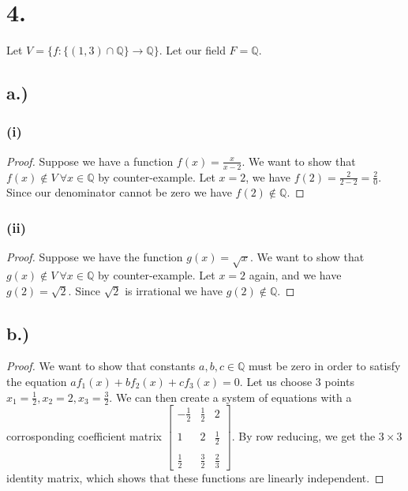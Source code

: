 \documentclass{article}
\begin{document}
\section*{4.}
Let $V = \{ f : \{(1,3) \cap \mathbb{Q}\} \rightarrow \mathbb{Q}\}$. Let our field $F = \mathbb{Q}$.
\subsection*{a.)}
\subsubsection*{(i)}
\begin{proof}
Suppose we have a function $f(x) = \frac{x}{x-2}$. We want to show that $f(x) \notin V \ \forall x \in \mathbb{Q}$ by counter-example. Let $x = 2$, we have $f(2) = \frac{2}{2-2} = \frac{2}{0}$. Since our denominator cannot be zero we have $f(2) \notin \mathbb{Q}$.

\end{proof}

\subsubsection*{(ii)}
\begin{proof}
Suppose we have the function $g(x) = \sqrt{x}$. We want to show that $g(x) \notin V \ \forall x \in \mathbb{Q}$ by counter-example. Let $x = 2$ again, and we have $g(2) = \sqrt{2}$. Since $\sqrt{2}$ is irrational we have $g(2) \notin \mathbb{Q}$.

\end{proof}

\subsection*{b.)}
\begin{proof}
We want to show that constants $a, b, c \in \mathbb{Q}$ must be zero in order to satisfy the equation $a f_1(x) + b f_2(x) + c f_3(x) = 0$. Let us choose 3 points $x_1 = \frac{1}{2}, x_2 = 2, x_3 = \frac{3}{2}$. We can then create a system of equations with a corrosponding coefficient matrix 
$\begin{bmatrix}
-\frac{1}{2} &\frac{1}{2} &2 \\\\
1 &2 &\frac{1}{2} \\\\
\frac{1}{2} &\frac{3}{2} & \frac{2}{3}
\end{bmatrix}$. By row reducing, we get the $3 \times 3$ identity matrix, which shows that these functions are linearly independent.

\end{proof}
\end{document}
